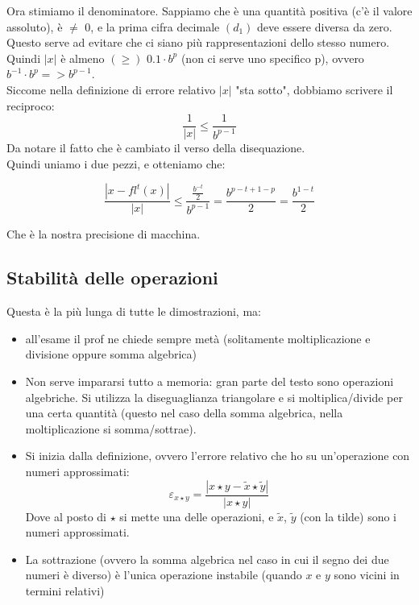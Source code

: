 Ora stimiamo il denominatore. Sappiamo che è una quantità positiva (c'è il valore assoluto), è $\neq$ 0, e la prima cifra decimale $(d_1)$ deve essere diversa da zero. Questo serve ad evitare che ci siano più rappresentazioni dello stesso numero.\\
Quindi $|x|$ è almeno $(\geq)$ $0.1 \cdot b^p$ (non ci serve uno specifico p), ovvero $b^{-1}\cdot b^p => b^{p-1}$.\\
Siccome nella definizione di errore relativo $|x|$ "sta sotto", dobbiamo scrivere il reciproco: 
\begin{displaymath}\frac{1}{|x|}\leq \frac{1}{b^{p-1}}\end{displaymath}
Da notare il fatto che è cambiato il verso della disequazione.\\
Quindi uniamo i due pezzi, e otteniamo che:\\
\begin{center}
    \large\begin{displaymath}
        \frac{|x-fl^t(x)|}{|x|}\leq \frac{\frac{b^{-t}}{2}}{b^{p-1}}= \frac{b^{p-t+1-p}}{2}= \frac{b^{1-t}}{2}
    \end{displaymath}
\end{center}
Che è la nostra precisione di macchina.
\newpage

\subsection{Stabilità delle operazioni}
Questa è la più lunga di tutte le dimostrazioni, ma:
\begin{itemize}
    \item all'esame il prof ne chiede sempre metà (solitamente moltiplicazione e divisione oppure somma algebrica)
    \item Non serve impararsi tutto a memoria: gran parte del testo sono operazioni algebriche. Si utilizza la diseguaglianza triangolare e si moltiplica/divide per una certa quantità (questo nel caso della somma algebrica, nella moltiplicazione si somma/sottrae).
    \item Si inizia dalla definizione, ovvero l'errore relativo che ho su un'operazione con numeri approssimati:\begin{displaymath}\varepsilon _{x\star y}=\frac{|x\star y - \widetilde{x}\star \widetilde{y}|}{|x \star y|} \end{displaymath}  Dove al posto di $\star$ si mette una delle operazioni, e $\widetilde{x}$, $\widetilde{y}$ (con la tilde) sono i numeri approssimati.
    \item La sottrazione (ovvero la somma algebrica nel caso in cui il segno dei due numeri è diverso) è l'unica operazione instabile (quando $x$ e $y$ sono vicini in termini relativi)
\end{itemize}


